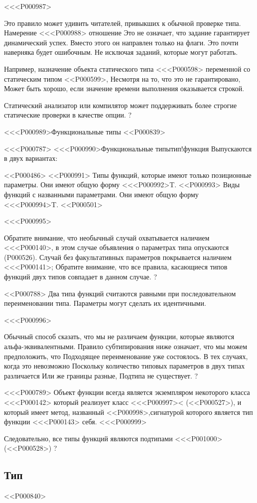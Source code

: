 <<<P000987>{%
Это правило может удивить читателей, привыкших к обычной проверке типа.
Намерение <<<P000988> отношение
Это не означает, что задание гарантирует динамический успех.
Вместо этого он направлен только на флаги.
Это почти наверняка будет ошибочным.
Не исключая заданий, которые могут работать.

Например, назначение объекта статического типа <<<P000598>
переменной со статическим типом <<P000599>,
Несмотря на то, что это не гарантировано,
Может быть хорошо, если значение времени выполнения оказывается строкой.

Статический анализатор или компилятор
может поддерживать более строгие статические проверки в качестве опции.
?


<<<P000989>{Функциональные типы}
<<P000839>

<<<P000787>%
<<<P000990>{Функциональные типы}{тип!функция}
Выпускаются в двух вариантах:

<<P000486>
<<P000991>
Типы функций, которые имеют только позиционные параметры.
Они имеют общую форму
<<<P000992>{T}.
<<P000993>
Виды функций с названными параметрами.
Они имеют общую форму
<<<P000994>{T}.
<<P000501>

<<<P000995>{%
Обратите внимание, что необычный случай охватывается наличием <<<P000140>,
в этом случае объявления о параметрах типа опускаются
(P000526).
Случай без факультативных параметров покрывается наличием <<<P000141>;
Обратите внимание, что все правила, касающиеся типов функций двух типов
совпадает в данном случае.%
?

<<P000788>%
Два типа функций считаются равными при последовательном переименовании типа.
Параметры могут сделать их идентичными.

<<<P000996>{%
Обычный способ сказать, что мы не различаем
функции, которые являются альфа-эквивалентными.
Правило субтипирования ниже означает, что мы можем предположить, что
Подходящее переименование уже состоялось.
В тех случаях, когда это невозможно
Поскольку количество типовых параметров в двух типах различается
Или же границы разные,
Подтипа не существует.%
?

<<<P000789>%
Объект функции всегда является экземпляром некоторого класса <<<P000142> который реализует
класс <<<P000997>< (<<P000527>),
и который имеет метод, названный <<P000998>,сигнатурой которого является тип функции <<<P000143> себя.
<<<P000999>{%
Следовательно, все типы функций являются подтипами <<<P001000>
(<<P000528>)%
?


\subsection{Тип \FUNCTION}}
<<P000840>

}}}
